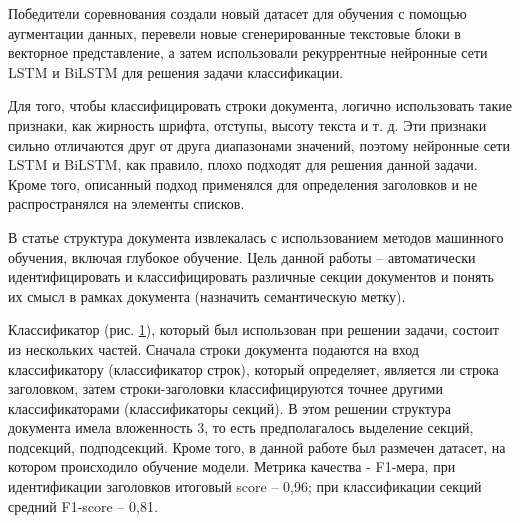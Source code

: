\documentclass{ProcISPRAS}
\begin{document}
Победители соревнования \cite{fintoc19tian} создали новый датасет для обучения с помощью аугментации данных, перевели новые сгенерированные текстовые блоки в векторное представление, а затем использовали рекуррентные нейронные сети LSTM и BiLSTM для решения задачи классификации.

Для того, чтобы классифицировать строки документа, логично использовать такие признаки, как жирность шрифта, отступы, высоту текста и т. д. Эти признаки сильно отличаются друг от друга диапазонами значений, поэтому нейронные сети LSTM и BiLSTM, как правило, плохо подходят для решения данной задачи. Кроме того, описанный подход применялся для определения заголовков и не распространялся на элементы списков.

В статье \cite{deep} структура документа извлекалась с использованием методов машинного обучения, включая глубокое обучение. Цель данной работы -- автоматически идентифицировать и классифицировать различные секции документов и понять их смысл в рамках документа (назначить семантическую метку).

\begin{figure}[ht]
    \label{fig:classifier}
\end{figure}

Классификатор (рис. \ref{fig:classifier}), который был использован при решении задачи, состоит из нескольких частей. Сначала строки документа подаются на вход классификатору (классификатор строк), который определяет, является ли строка заголовком, затем строки-заголовки классифицируются точнее другими классификаторами (классификаторы секций). В этом решении структура документа имела вложенность 3, то есть предполагалось выделение секций, подсекций, подподсекций.
Кроме того, в данной работе был размечен датасет, на котором происходило обучение модели. Метрика качества - F1-мера, при идентификации заголовков итоговый score -- 0,96; при классификации секций средний F1-score -- 0,81.
\end{document}
